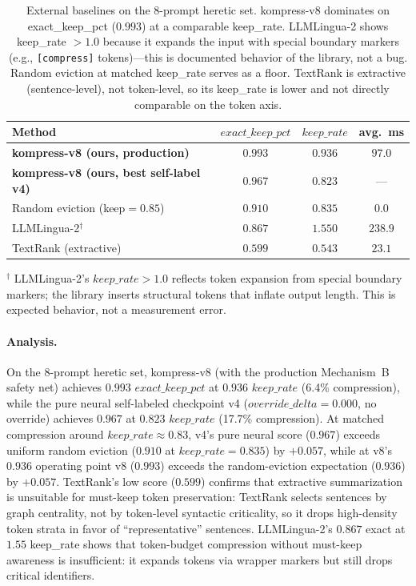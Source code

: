 \begin{table}[h]
\centering
\caption{External baselines on the 8-prompt heretic set. kompress-v8
dominates on exact\_keep\_pct ($0.993$) at a comparable keep\_rate. LLMLingua-2
shows keep\_rate $>1.0$ because it expands the input with special boundary
markers (e.g., \texttt{[compress]} tokens)---this is documented behavior of
the library, not a bug. Random eviction at matched keep\_rate serves as a
floor. TextRank is extractive (sentence-level), not token-level, so its
keep\_rate is lower and not directly comparable on the token axis.}
\label{tab:baselines}
\begin{tabular}{lccc}
\toprule
Method & $\mathit{exact\_keep\_pct}$ & $\mathit{keep\_rate}$ & avg.\ ms \\
\midrule
\textbf{kompress-v8 (ours, production)} & $\mathbf{0.993}$ & $0.936$ & $97.0$ \\
\textbf{kompress-v8 (ours, best self-label v4)} & $\mathbf{0.967}$ & $0.823$ & --- \\
\midrule
Random eviction (keep$=0.85$) & $0.910$ & $0.835$ & $0.0$ \\
LLMLingua-2$^\dagger$          & $0.867$ & $1.550$ & $238.9$ \\
TextRank (extractive)         & $0.599$ & $0.543$ & $23.1$ \\
\bottomrule
\end{tabular}

\smallskip
$^\dagger$ LLMLingua-2's $\mathit{keep\_rate} > 1.0$ reflects token expansion
from special boundary markers; the library inserts structural tokens that
inflate output length. This is expected behavior, not a measurement error.
\end{table}

\paragraph{Analysis.} On the 8-prompt heretic set, kompress-v8 (with the
production Mechanism~B safety net) achieves $0.993$ $\mathit{exact\_keep\_pct}$
at $0.936$ $\mathit{keep\_rate}$ (6.4\% compression), while the pure neural
self-labeled checkpoint v4 ($\mathit{override\_delta}{=}0.000$, no override)
achieves $0.967$ at $0.823$ $\mathit{keep\_rate}$ (17.7\% compression). At
matched compression around $\mathit{keep\_rate}\approx 0.83$, v4's pure neural
score ($0.967$) exceeds uniform random eviction ($0.910$ at
$\mathit{keep\_rate}{=}0.835$) by $+0.057$, while at v8's $0.936$ operating
point v8 ($0.993$) exceeds the random-eviction expectation ($0.936$) by
$+0.057$. TextRank's low score ($0.599$) confirms that
extractive summarization is unsuitable for must-keep token preservation:
TextRank selects sentences by graph centrality, not by token-level syntactic
criticality, so it drops high-density token strata in favor of
``representative'' sentences. LLMLingua-2's $0.867$ exact at $1.55$ keep\_rate
shows that token-budget compression without must-keep awareness is
insufficient: it expands tokens via wrapper markers but still drops critical
identifiers.

